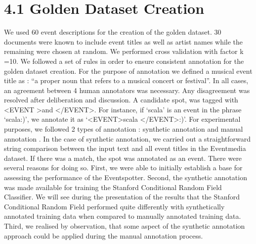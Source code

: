 \documentclass[a4paper,11pt]{report}
\begin{document}
\section*{4.1 Golden Dataset Creation}
We used 60 event descriptions for the creation of the golden dataset. 30 documents were known to include event titles as well as artist names while the remaining were chosen at random. We performed cross validation with factor k =10. We followed a set of rules in order to ensure consistent annotation for the golden dataset creation. For the purpose of annotation we defined a musical event title as : ``a proper noun that refers to a musical concert or festival''. In all cases, an agreement between 4 human annotators was necessary. Any disagreement was resolved after deliberation and discussion. A candidate spot, was tagged with \textless EVENT \textgreater  and \textless /EVENT\textgreater. For instance, if `scala' is an event in the phrase `scala:)', we annotate it as `\textless EVENT\textgreater scala \textless /EVENT\textgreater:)'. For experimental purposes, we followed 2 types of annotation : synthetic annotation and manual annotation .\newline 
	In the case of synthetic annotation, we carried out a straightforward string comparison between the input text and all event titles in the Eventmedia dataset. If there was a match, the spot was annotated as an event. There were several reasons for doing so. First, we were able to initially establish a base for assessing the performance of the Eventspotter. Second, the synthetic annotation was made available for training the Stanford Conditional Random Field Classifier. We will see during the presentation of the results that the Stanford Conditional Random Field performed quite differently with synthetically annotated training data when compared to manually annotated training data. Third, we realised by observation, that some aspect of the synthetic annotation approach could be applied during the manual annotation process.\newline
\end{document}
